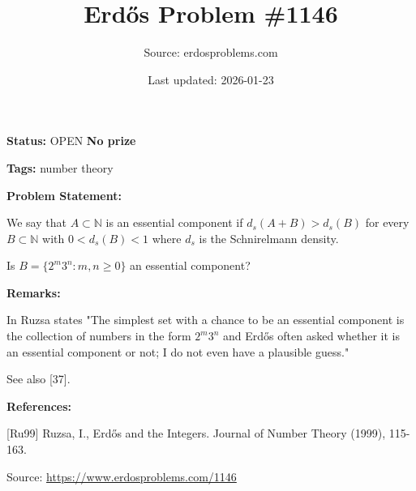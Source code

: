 \documentclass{article}
\title{Erd\H{o}s Problem \#1146}
\date{Last updated: 2026-01-23}
\author{Source: erdosproblems.com}
\begin{document}
\maketitle

\noindent\textbf{Status:} OPEN \quad \textbf{No prize}

\noindent\textbf{Tags:} number theory

\medskip
\noindent\textbf{Problem Statement:}

We say that $A\subset \mathbb{N}$ is an essential component if $d_s(A+B)>d_s(B)$ for every $B\subset \mathbb{N}$ with $0<d_s(B)<1$ where $d_s$ is the Schnirelmann density.

Is $B=\{2^m3^n : m,n\geq 0\}$ an essential component?

\bigskip
\noindent\textbf{Remarks:}

In \cite{Ru99} Ruzsa states "The simplest set with a chance to be an essential component is the collection of numbers in the form $2^m3^n$ and Erd\H{o}s often asked whether it is an essential component or not; I do not even have a plausible guess."

See also [37].

\bigskip
\noindent\textbf{References:}

[Ru99] Ruzsa, I., Erd\H{o}s and the Integers. Journal of Number Theory (1999), 115-163.

\bigskip
\noindent\small{Source: \url{https://www.erdosproblems.com/1146}}
\end{document}
